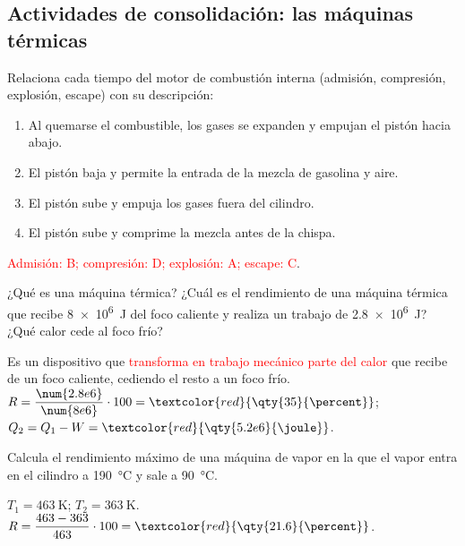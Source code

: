 \subsection*{Actividades de consolidación: las máquinas térmicas}

\begin{exercise}
    Relaciona cada tiempo del motor de combustión interna (admisión, compresión, explosión, escape) con su descripción:
    \begin{enumerate}[label=\Alph*.]
        \item Al quemarse el combustible, los gases se expanden y empujan el pistón hacia abajo.
        \item El pistón baja y permite la entrada de la mezcla de gasolina y aire.
        \item El pistón sube y empuja los gases fuera del cilindro.
        \item El pistón sube y comprime la mezcla antes de la chispa.
    \end{enumerate}
    \begin{solu}
        \textcolor{red}{Admisión: B; compresión: D; explosión: A; escape: C}.
    \end{solu}
\end{exercise}

\begin{exercise}
    ¿Qué es una máquina térmica? ¿Cuál es el rendimiento de una máquina térmica que recibe \qty{8e6}{\joule} del foco caliente y realiza un trabajo de \qty{2.8e6}{\joule}? ¿Qué calor cede al foco frío?
    \begin{solu}
        Es un dispositivo que \textcolor{red}{transforma en trabajo mecánico parte del calor} que recibe de un foco caliente, cediendo el resto a un foco frío.
        \(R = \dfrac{\num{2.8e6}}{\num{8e6}} \cdot 100 = \textcolor{red}{\qty{35}{\percent}}\); \(Q_2 = Q_1 - W = \textcolor{red}{\qty{5.2e6}{\joule}}\).
    \end{solu}
\end{exercise}

\begin{exercise}
    Calcula el rendimiento máximo de una máquina de vapor en la que el vapor entra en el cilindro a \qty{190}{\degreeCelsius} y sale a \qty{90}{\degreeCelsius}.
    \begin{solu}
        \(T_1 = \qty{463}{\kelvin}\); \(T_2 = \qty{363}{\kelvin}\). \(R = \dfrac{463 - 363}{463} \cdot 100 = \textcolor{red}{\qty{21.6}{\percent}}\).
    \end{solu}
\end{exercise}

